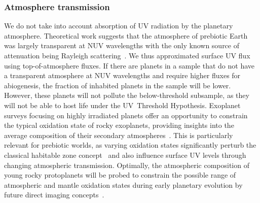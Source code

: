 \documentclass[twocolumn,twocolappendix,linenumbers]{aastex631}
\begin{document}
\subsubsection{Atmosphere transmission}
We do not take into account absorption of \gls{UV} radiation by the planetary atmosphere.
Theoretical work suggests that the atmosphere of prebiotic Earth was largely transparent at \gls{NUV} wavelengths with the only known source of attenuation being Rayleigh scattering~\citep{Ranjan2017,Ranjan2017c}.
We thus approximated surface \gls{UV} flux using top-of-atmosphere fluxes.
If there are planets in a sample that do not have a transparent atmosphere at \gls{NUV} wavelengths and require higher fluxes for abiogenesis, the fraction of inhabited planets in the sample will be lower.
However, these planets will not pollute the below-threshold subsample, as they will not be able to host life under the UV~Threshold Hypothesis.
Exoplanet surveys focusing on highly irradiated planets offer an opportunity to constrain the typical oxidation state of rocky exoplanets, providing insights into the average composition of their secondary atmospheres~\citep{Lichtenberg2024}.
This is particularly relevant for prebiotic worlds, as varying oxidation states significantly perturb the classical habitable zone concept~\citep{Nicholls2024} and also influence surface \gls{UV} levels through changing atmospheric transmission.
Optimally, the atmospheric composition of young rocky protoplanets will be probed to constrain the possible range of atmospheric and mantle oxidation states during early planetary evolution by future direct imaging concepts~\citep{Cesario2024}.


\end{document}
